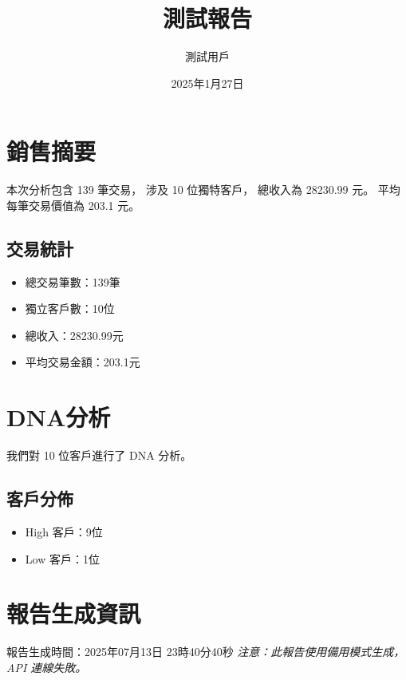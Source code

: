 \documentclass[UTF8]{ctexart}
\title{測試報告}
\author{測試用戶}
\date{2025年1月27日}
\begin{document}
\maketitle

\section{銷售摘要}
本次分析包含 139 筆交易，
涉及 10 位獨特客戶，
總收入為 28230.99 元。
平均每筆交易價值為 203.1 元。

\subsection{交易統計}
\begin{itemize}
\item 總交易筆數：139筆
\item 獨立客戶數：10位
\item 總收入：28230.99元
\item 平均交易金額：203.1元
\end{itemize}

\section{DNA分析}
我們對 10 位客戶進行了 DNA 分析。

\subsection{客戶分佈}
\begin{itemize}
\item High 客戶：9位
\item Low 客戶：1位
\end{itemize}

\section{報告生成資訊}
報告生成時間：2025年07月13日 23時40分40秒
\textit{注意：此報告使用備用模式生成，API 連線失敗。}
\end{document}
